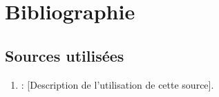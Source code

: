 \chapter{Bibliographie}
\label{sec:bibliographie}

\section{Sources utilisées}

\begin{enumerate}[leftmargin=1cm,label=\arabic*)]
\item {} :
[Description de l'utilisation de cette source].
\end{enumerate}
